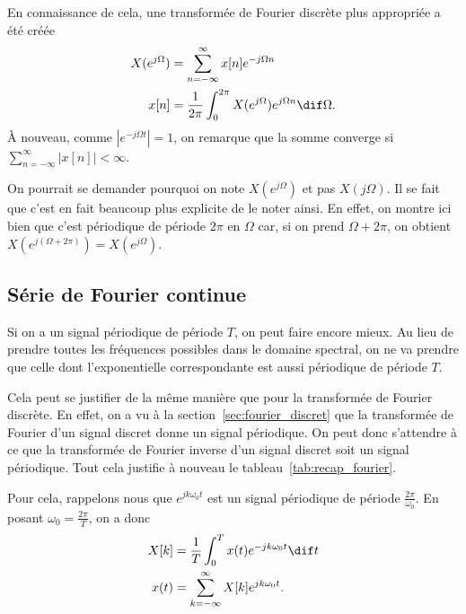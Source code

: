 En connaissance de cela, une transformée de Fourier discrète plus appropriée
a été créée
\begin{align*}
  X(e^{j\Omega}) & = \sum_{n=-\infty}^\infty x[n]e^{-j\Omega n}\\
  x[n] & = \frac{1}{2\pi}
  \int_{0}^{2\pi} X(e^{j\Omega})e^{j\Omega n} \dif \Omega.
\end{align*}
À nouveau, comme $|e^{-j\Omega t}| = 1$, on remarque que la somme
converge si $\sum_{n=-\infty}^\infty |x[n]| < \infty$.

On pourrait se demander pourquoi on note $X(e^{j\Omega})$ et pas $X(j\Omega)$.
Il se fait que c'est en fait beaucoup plus explicite de le noter ainsi.
En effet, on montre ici bien que c'est périodique de période $2\pi$
en $\Omega$ car, si on prend $\Omega + 2\pi$,
on obtient $X(e^{j(\Omega + 2\pi)}) = X(e^{j\Omega})$.

\subsection{Série de Fourier continue}
Si on a un signal périodique de période $T$, on peut faire encore mieux.
Au lieu de prendre toutes les fréquences possibles dans le domaine spectral,
on ne va prendre que celle dont l'exponentielle correspondante est
aussi périodique de période $T$.

Cela peut se justifier de la même manière que pour
la transformée de Fourier discrète.
En effet, on a vu à la section~\ref{sec:fourier_discret}
que la transformée de Fourier d'un signal discret
donne un signal périodique.
On peut donc s'attendre à ce que la transformée de Fourier inverse d'un
signal discret soit un signal périodique.
Tout cela justifie à nouveau le tableau~\ref{tab:recap_fourier}.

Pour cela, rappelons nous que $e^{jk\omega_0t}$ est un signal périodique
de période $\frac{2\pi}{\omega_0}$.
En posant $\omega_0 = \frac{2\pi}{T}$, on a donc
\begin{align}
  \label{eq:sfc}
  X[k] & = \frac{1}{T}\int_0^T x(t) e^{-jk\omega_0t} \dif t\\
  \label{eq:sfci}
  x(t) & = \sum_{k=-\infty}^\infty X[k]e^{jk\omega_0t}.
\end{align}

